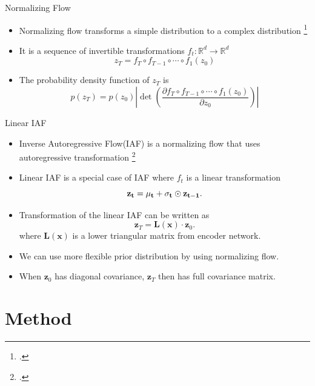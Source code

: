 \documentclass{beamer}
\begin{document}
\begin{frame}{Normalizing Flow}
    \begin{itemize}
        \item Normalizing flow transforms a simple distribution to a complex distribution \footcite{rezende15normalizingflows}
        \item It is a sequence of invertible transformations $f_t : \mathbb R^d \to \mathbb R^d$
        \begin{equation}
            z_T = f_T \circ f_{T-1} \circ \cdots \circ f_1(z_0)
        \end{equation}
        \item The probability density function of $z_T$ is
        \begin{equation}
            p(z_T) = p(z_0) \left| \det \left( \frac{\partial f_T \circ f_{T-1} \circ \cdots \circ f_1(z_0)}{\partial z_0} \right) \right|
        \end{equation}
    \end{itemize}
\end{frame}

\begin{frame}{Linear IAF}
    \begin{itemize}
        \item Inverse Autoregressive Flow(IAF) is a normalizing flow that uses autoregressive transformation \footcite{kingma2016iaf}
        \item Linear IAF is a special case of IAF where $f_t$ is a linear transformation
        \begin{equation}
            \bf z_t = \bf \mu_t + \bf \sigma_t \odot \bf z_{t-1}.
        \end{equation}
        \item Transformation of the linear IAF can be written as
        \begin{equation}
            \mathbf{z}_T = \mathbf{L(x)} \cdot \mathbf{z}_0.
        \end{equation}
        where $\mathbf{L(x)}$ is a lower triangular matrix from encoder network.
        \item We can use more flexible prior distribution by using normalizing flow.
        \item When $\mathbf z_0$ has diagonal covariance, $\mathbf z_T$ then has full covariance matrix.
    \end{itemize}
\end{frame}

\section{Method}
\end{document}
